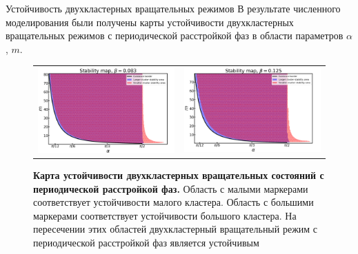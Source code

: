 \begin{chapter}{Устойчивость двухкластерных вращательных режимов}
	В результате численного моделирования были получены карты устойчивости двухкластерных вращательных
	режимов с периодической расстройкой фаз в области параметров $\alpha$, $m$.

	\begin{figure}[h!]\center
		\begin{tabular}{cc}
		\includegraphics[width=0.5\columnwidth]{pictures/map-0-083.png}
		&
		\includegraphics[width=0.5\columnwidth]{pictures/map-0-0125.png}
		\end{tabular}
		\caption{\textbf{Карта устойчивости двухкластерных вращательных состояний с периодической расстройкой фаз.}
		Область с малыми маркерами соответствует устойчивости малого кластера.
		Область с большими маркерами соответствует устойчивости большого кластера.
		На пересечении этих областей двухкластерный вращательный режим с периодической расстройкой фаз является устойчивым}
		\label{map-083}
	\end{figure}


\end{chapter}
